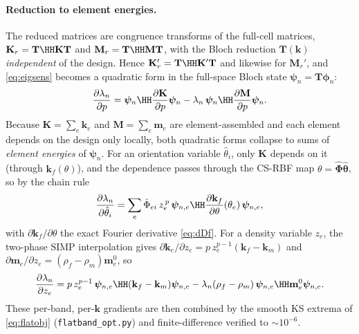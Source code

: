 \documentclass[11pt]{article}
\begin{document}
\paragraph{Reduction to element energies.} The reduced matrices are congruence
transforms of the full-cell matrices, $\mathbf K_r=\mathbf T\HH\mathbf K\mathbf T$
and $\mathbf M_r=\mathbf T\HH\mathbf M\mathbf T$, with the Bloch reduction
$\mathbf T(\mathbf k)$ \emph{independent} of the design. Hence
$\mathbf K_r'=\mathbf T\HH\mathbf K'\mathbf T$ and likewise for $\mathbf M_r'$, and
\eqref{eq:eigsens} becomes a quadratic form in the full-space Bloch state
$\bm\psi_n=\mathbf T\bm\phi_n$:
\begin{equation}
  \frac{\partial\lambda_n}{\partial p}
  =\bm\psi_n\HH\frac{\partial\mathbf K}{\partial p}\bm\psi_n
  -\lambda_n\,\bm\psi_n\HH\frac{\partial\mathbf M}{\partial p}\bm\psi_n.
\end{equation}
Because $\mathbf K=\sum_e\mathbf k_e$ and $\mathbf M=\sum_e\mathbf m_e$ are
element-assembled and each element depends on the design only locally, both
quadratic forms collapse to sums of \emph{element energies} of $\bm\psi_n$. For
an orientation variable $\hat\theta_i$, only $\mathbf K$ depends on it (through
$\mathbf k_f(\theta)$), and the dependence passes through the CS-RBF map
$\theta=\hat{\bm\Phi}\hat{\bm\theta}$, so by the chain rule
\begin{equation}
  \frac{\partial\lambda_n}{\partial\hat\theta_i}
  =\sum_e\hat\Phi_{ei}\,z_e^{\,p}\,
  \bm\psi_{n,e}\HH\frac{\partial\mathbf k_f}{\partial\theta}(\theta_e)\,
  \bm\psi_{n,e},
\end{equation}
with $\partial\mathbf k_f/\partial\theta$ the exact Fourier derivative
\eqref{eq:dDf}. For a density variable $z_e$, the two-phase SIMP interpolation
gives $\partial\mathbf k_e/\partial z_e=p\,z_e^{p-1}(\mathbf k_f-\mathbf k_m)$ and
$\partial\mathbf m_e/\partial z_e=(\rho_f-\rho_m)\mathbf m_e^0$, so
\begin{equation}
  \frac{\partial\lambda_n}{\partial z_e}
  =p\,z_e^{p-1}\,\bm\psi_{n,e}\HH(\mathbf k_f-\mathbf k_m)\bm\psi_{n,e}
  -\lambda_n(\rho_f-\rho_m)\,\bm\psi_{n,e}\HH\mathbf m_e^0\bm\psi_{n,e}.
\end{equation}
These per-band, per-$\mathbf k$ gradients are then combined by the smooth KS
extrema of \eqref{eq:flatobj} (\texttt{flatband\_opt.py}) and finite-difference
verified to $\sim\!10^{-6}$.
\end{document}
